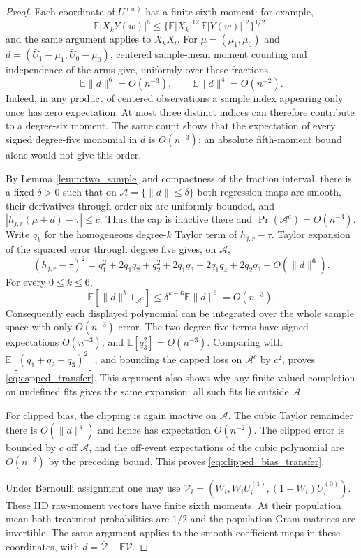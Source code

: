 \documentclass{article}
\newcommand{\EEE}{\mathbb{E}}
\theoremstyle{plain}
\theoremstyle{definition}
\theoremstyle{remark}
\begin{document}
\begin{proof}
Each coordinate of $U^{(w)}$ has a finite sixth moment: for example,
\[
\EEE|X_kY(w)|^6
\le\{\EEE|X_k|^{12}\,\EEE|Y(w)|^{12}\}^{1/2},
\]
and the same argument applies to $X_kX_l$. For
$\mu=(\mu_1,\mu_0)$ and $d=(\bar U_1-\mu_1,\bar U_0-\mu_0)$, centered sample-mean moment
counting and independence of the arms give, uniformly over these
fractions,
\[
\EEE\|d\|^6=O(n^{-3}),\qquad
\EEE\|d\|^4=O(n^{-2}).
\]
Indeed, in any product of centered observations a sample index
appearing only once has zero expectation. At most three distinct
indices can therefore contribute to a degree-six moment. The same
count shows that the expectation of every signed degree-five
monomial in $d$ is $O(n^{-3})$; an absolute fifth-moment bound alone
would not give this order.

By Lemma \ref{lemm:two_sample} and compactness of the fraction
interval, there is a fixed $\delta>0$ such that on
$\mathcal A=\{\|d\|\le\delta\}$ both regression maps are smooth,
their derivatives through order six are uniformly bounded, and
$|h_{j,r}(\mu+d)-\tau|\le c$. Thus the cap is inactive there and
$\Pr(\mathcal A^c)=O(n^{-3})$. Write $q_k$ for the homogeneous
degree-$k$ Taylor term of $h_{j,r}-\tau$. Taylor expansion of the
squared error through degree five gives, on $\mathcal A$,
\[
(h_{j,r}-\tau)^2
=q_1^2+2q_1q_2+q_2^2+2q_1q_3
+2q_1q_4+2q_2q_3+O(\|d\|^6).
\]
For every $0\le k\le6$,
\[
\EEE[\|d\|^k\mathbf 1_{\mathcal A^c}]
\le\delta^{k-6}\EEE\|d\|^6=O(n^{-3}).
\]
Consequently each displayed polynomial can be integrated over the
whole sample space with only $O(n^{-3})$ error. The two degree-five
terms have signed expectations $O(n^{-3})$, and
$\EEE[q_3^2]=O(n^{-3})$. Comparing with
$\EEE[(q_1+q_2+q_3)^2]$, and bounding the capped loss on
$\mathcal A^c$ by $c^2$, proves \eqref{eq:capped_transfer}.
This argument also shows why any finite-valued completion on
undefined fits gives the same expansion: all such fits lie outside
$\mathcal A$.

For clipped bias, the clipping is again inactive on $\mathcal A$.
The cubic Taylor remainder there is $O(\|d\|^4)$ and hence has
expectation $O(n^{-2})$. The clipped error is bounded by $c$ off
$\mathcal A$, and the off-event expectations of the cubic polynomial
are $O(n^{-3})$ by the preceding bound. This proves
\eqref{eq:clipped_bias_transfer}.

Under Bernoulli assignment one may use
$\mathcal V_i=(W_i,W_iU_i^{(1)},(1-W_i)U_i^{(0)})$.
These IID raw-moment vectors have finite sixth moments. At their
population mean both treatment probabilities are $1/2$ and the
population Gram matrices are invertible. The same argument applies
to the smooth coefficient maps in these coordinates, with
$d=\bar{\mathcal V}-\EEE\mathcal V$.
\end{proof}
\end{document}

